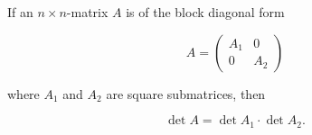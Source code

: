If an $n \times n$-matrix $A$ is of the block diagonal form

$$A = \begin{pmatrix} A_1 & 0 \\ 0 & A_2 \end{pmatrix}$$

where $A_1$ and $A_2$ are square submatrices, then

$$\det A = \det A_1 \cdot \det A_2.$$
